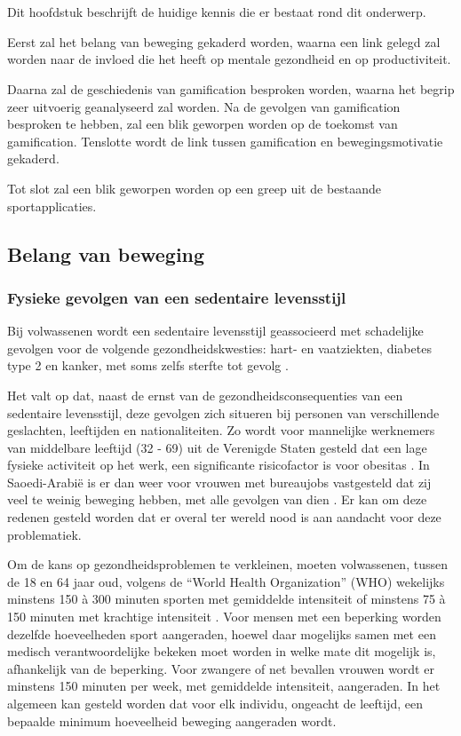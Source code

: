 \chapter{}%
\label{ch:stand-van-zaken}

Dit hoofdstuk beschrijft de huidige kennis die er bestaat rond dit onderwerp.

Eerst zal het belang van beweging gekaderd worden, waarna een link gelegd zal worden naar de invloed die het heeft op mentale gezondheid en op productiviteit.

Daarna zal de geschiedenis van gamification besproken worden, waarna het begrip zeer uitvoerig geanalyseerd zal worden. Na de gevolgen van gamification besproken te hebben, zal een blik geworpen worden op de toekomst van gamification. Tenslotte wordt de link tussen gamification en bewegingsmotivatie gekaderd.

Tot slot zal een blik geworpen worden op een greep uit de bestaande sportapplicaties.

\section{Belang van beweging}

\subsection{Fysieke gevolgen van een sedentaire levensstijl}
\label{ssec:fysieke-gevolgen}
Bij volwassenen wordt een sedentaire levensstijl geassocieerd met schadelijke gevolgen voor de volgende gezondheidskwesties: hart- en vaatziekten, diabetes type 2 en kanker, met soms zelfs sterfte tot gevolg \autocite{Bull2020}.

Het valt op dat, naast de ernst van de gezondheidsconsequenties van een sedentaire levensstijl, deze gevolgen zich situeren bij personen van verschillende geslachten, leeftijden en nationaliteiten. Zo wordt voor mannelijke werknemers van middelbare leeftijd (32 - 69) uit de Verenigde Staten gesteld dat een lage fysieke activiteit op het werk, een significante risicofactor is voor obesitas \autocite{Choi2010}. In Saoedi-Arabië is er dan weer voor vrouwen met bureaujobs vastgesteld dat zij veel te weinig beweging hebben, met alle gevolgen van dien \autocite{Albawardi2017}. Er kan om deze redenen gesteld worden dat er overal ter wereld nood is aan aandacht voor deze problematiek.

Om de kans op gezondheidsproblemen te verkleinen, moeten volwassenen, tussen de 18 en 64 jaar oud, volgens de ``World Health Organization'' (WHO) wekelijks minstens 150 à 300 minuten sporten met gemiddelde intensiteit of minstens 75 à 150 minuten met krachtige intensiteit \autocite{Bull2020}. Voor mensen met een beperking worden dezelfde hoeveelheden sport aangeraden, hoewel daar mogelijks samen met een medisch verantwoordelijke bekeken moet worden in welke mate dit mogelijk is, afhankelijk van de beperking. Voor zwangere of net bevallen vrouwen wordt er minstens 150 minuten per week, met gemiddelde intensiteit, aangeraden. In het algemeen kan gesteld worden dat voor elk individu, ongeacht de leeftijd, een bepaalde minimum hoeveelheid beweging aangeraden wordt.

